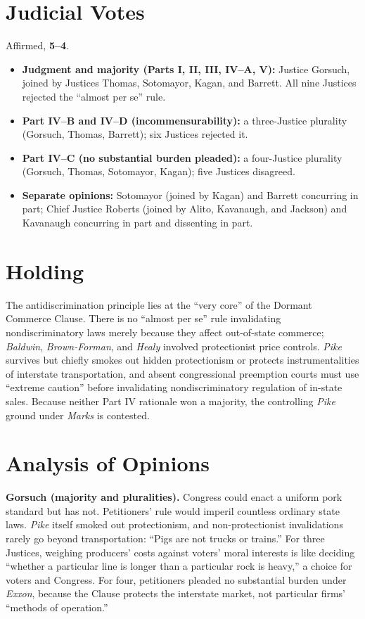 \documentclass[12pt]{article}
\begin{document}
\section{Judicial Votes}

Affirmed, \textbf{5--4}.
\begin{itemize}
\item \textbf{Judgment and majority (Parts I, II, III, IV--A, V):} Justice Gorsuch, joined by Justices Thomas, Sotomayor, Kagan, and Barrett. All nine Justices rejected the ``almost per se'' rule.
\item \textbf{Part IV--B and IV--D (incommensurability):} a three-Justice plurality (Gorsuch, Thomas, Barrett); six Justices rejected it.
\item \textbf{Part IV--C (no substantial burden pleaded):} a four-Justice plurality (Gorsuch, Thomas, Sotomayor, Kagan); five Justices disagreed.
\item \textbf{Separate opinions:} Sotomayor (joined by Kagan) and Barrett concurring in part; Chief Justice Roberts (joined by Alito, Kavanaugh, and Jackson) and Kavanaugh concurring in part and dissenting in part.
\end{itemize}

\section{Holding}

The antidiscrimination principle lies at the ``very core'' of the Dormant Commerce Clause. There is no ``almost per se'' rule invalidating nondiscriminatory laws merely because they affect out-of-state commerce; \textit{Baldwin}, \textit{Brown-Forman}, and \textit{Healy} involved protectionist price controls. \textit{Pike} survives but chiefly smokes out hidden protectionism or protects instrumentalities of interstate transportation, and absent congressional preemption courts must use ``extreme caution'' before invalidating nondiscriminatory regulation of in-state sales. Because neither Part IV rationale won a majority, the controlling \textit{Pike} ground under \textit{Marks} is contested.

\section{Analysis of Opinions}

\textbf{Gorsuch (majority and pluralities).} Congress could enact a uniform pork standard but has not. Petitioners' rule would imperil countless ordinary state laws. \textit{Pike} itself smoked out protectionism, and non-protectionist invalidations rarely go beyond transportation: ``Pigs are not trucks or trains.'' For three Justices, weighing producers' costs against voters' moral interests is like deciding ``whether a particular line is longer than a particular rock is heavy,'' a choice for voters and Congress. For four, petitioners pleaded no substantial burden under \textit{Exxon}, because the Clause protects the interstate market, not particular firms' ``methods of operation.''
\end{document}
